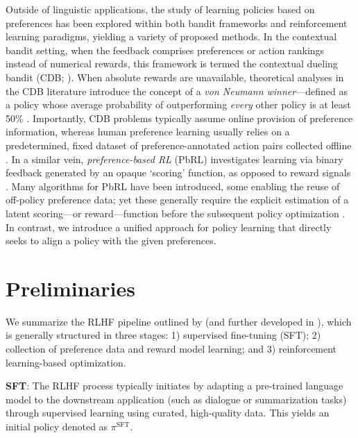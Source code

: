 Outside of linguistic applications, the study of learning policies based on preferences has been explored within both bandit frameworks and reinforcement learning paradigms, yielding a variety of proposed methods. In the contextual bandit setting, when the feedback comprises preferences or action rankings instead of numerical rewards, this framework is termed the contextual dueling bandit (CDB; \cite{yue2012karmed,dudik2015contextual}). When absolute rewards are unavailable, theoretical analyses in the CDB literature introduce the concept of a \textit{von Neumann winner}—defined as a policy whose average probability of outperforming \textit{every} other policy is at least 50\% \citep{dudik2015contextual}. Importantly, CDB problems typically assume online provision of preference information, whereas human preference learning usually relies on a predetermined, fixed dataset of preference-annotated action pairs collected offline \citep{yan2022human}. In a similar vein, \textit{preference-based RL} (PbRL) investigates learning via binary feedback generated by an opaque ‘scoring’ function, as opposed to reward signals \citep{BusaFekete2014,ruiz2023dueling}. Many algorithms for PbRL have been introduced, some enabling the reuse of off-policy preference data; yet these generally require the explicit estimation of a latent scoring—or reward—function before the subsequent policy optimization \citep{jain2013learning,BusaFekete2014,christiano2017deep,sadigh2017active,kupcsik2018learning}. In contrast, we introduce a unified approach for policy learning that directly seeks to align a policy with the given preferences.

\section{Preliminaries}\label{section:prelims}

We summarize the RLHF pipeline outlined by \citeauthor{ziegler2020finetuning} (and further developed in \citep{stiennon2022learning, bai2022training, ouyang2022training}), which is generally structured in three stages: 1) supervised fine-tuning (SFT); 2) collection of preference data and reward model learning; and 3) reinforcement learning-based optimization.

\textbf{SFT}: The RLHF process typically initiates by adapting a pre-trained language model to the downstream application (such as dialogue or summarization tasks) through supervised learning using curated, high-quality data. This yields an initial policy denoted as $\pi^\text{SFT}$.

